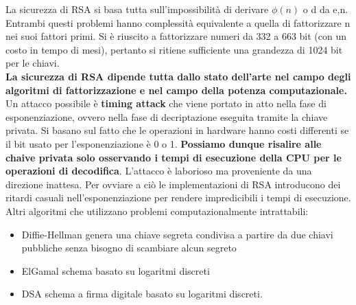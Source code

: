 \documentclass[12pt]{article}
\begin{document}
			La sicurezza di RSA si basa tutta sull'impossibilità di derivare $\phi(n)$ o d da e,n. Entrambi questi problemi hanno complessità equivalente a quella di fattorizzare n nei suoi fattori primi. Si è riuscito a fattorizzare numeri da 332 a 663 bit (con un costo in tempo di mesi), pertanto si ritiene sufficiente una grandezza di 1024 bit per le chiavi. \\
			\textbf{La sicurezza di RSA dipende tutta dallo stato dell'arte nel campo degli algoritmi di fattorizzazione e nel campo della potenza computazionale.}\\
			Un attacco possibile è \textbf{timing attack} che viene portato in atto nella fase di esponenziazione, ovvero nella fase di decriptazione eseguita tramite la chiave privata. Si basano sul fatto che le operazioni in hardware hanno costi differenti se il bit usato per l'esponenziazione è 0 o 1. \textbf{Possiamo dunque risalire alle chaive privata solo osservando i tempi di esecuzione della CPU per le operazioni di decodifica}. L'attacco è laborioso ma proveniente da una direzione inattesa. Per ovviare a ciò le implementazioni di RSA introducono dei ritardi casuali nell'esponenziazione per rendere impredicibili i tempi di esecuzione.
			Altri algoritmi che utilizzano problemi computazionalmente intrattabili:
			\begin{itemize}
				\item Diffie-Hellman genera una chiave segreta condivisa a partire da due chiavi pubbliche senza bisogno di scambiare alcun segreto
				\item ElGamal schema basato su logaritmi discreti
				\item DSA schema a firma digitale basato su logaritmi discreti.
			\end{itemize}
\end{document}
